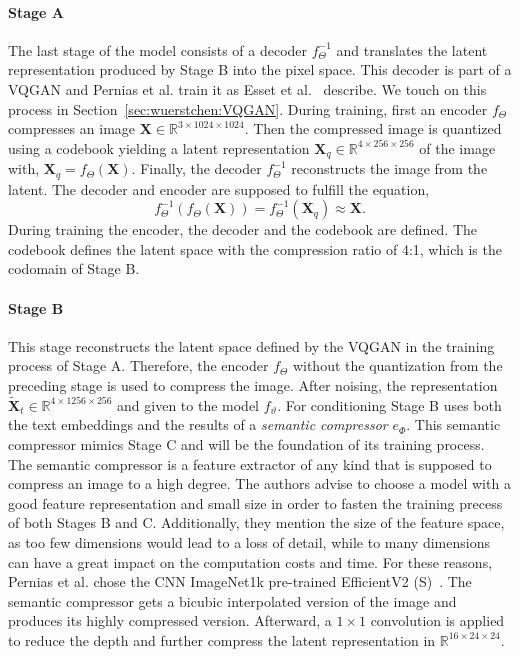 \paragraph*{Stage A} The last stage of the model consists of a decoder
$f_{\Theta}^{-1}$ and translates the latent representation produced by Stage B into
the pixel space. This decoder is part of a VQGAN and Pernias et al. train it as
Esset et al.~\cite{esser2021tamingtransformershighresolutionimage} describe.
We touch on this process in Section~\ref{sec:wuerstchen:VQGAN}. During training,
first an encoder $f_{\Theta}$ compresses an image $\boldsymbol{X}\in\mathbb{R}^{3\times1024\times1024}$. Then the compressed image is
quantized using a codebook yielding a latent representation $\boldsymbol{X}_q\in\mathbb{R}^{4\times256\times256}$ of the image with,
$\boldsymbol{X}_q = f_{\Theta}(\boldsymbol{X}).$
Finally, the decoder $f_{\Theta}^{-1}$ reconstructs the image from the latent.
The decoder and encoder are supposed to fulfill the equation,
\begin{equation}
    f_{\Theta}^{-1}(f_{\Theta}(\boldsymbol{X})) = f_{\Theta}^{-1}(\boldsymbol{X}_q) \approx \boldsymbol{X}.
\end{equation}
During training the encoder, the decoder and the codebook are defined. The
codebook defines the latent space with the compression ratio of 4:1, which is
the codomain of Stage B.

\paragraph*{Stage B} This stage reconstructs the latent space defined by the
VQGAN in the training process of Stage A. Therefore, the encoder $f_{\Theta}$
without the quantization from the preceding stage is used to compress the image.
After noising, the representation $\tilde{\boldsymbol{X}}_t\in\mathbb{R}^{4\times1256\times256}$ and given to the model $f_\vartheta$. For
conditioning Stage B uses both the text embeddings and the results of a
\emph{semantic compressor} $e_{\Phi}$. This semantic compressor mimics Stage C and will be
the foundation of its training process.\\

The semantic compressor is a feature extractor of any kind that is supposed to
compress an image to a high degree. The authors advise to choose a model with a
good feature representation and small size in order to fasten the training
precess of both Stages B and C. Additionally, they mention the size of the
feature space, as too few dimensions would lead to a loss of detail, while to
many dimensions can have a great impact on the computation costs and time. For
these reasons, Pernias et al. chose the CNN ImageNet1k pre-trained EfficientV2 (S)~\cite{Tan2021EfficientNetV2}.
The semantic compressor gets a bicubic interpolated version of the image and
produces its highly compressed version. Afterward, a $1\times1$ convolution is
applied to reduce the depth and further compress the latent representation in $\mathbb{R}^{16\times24\times24}$. \\

